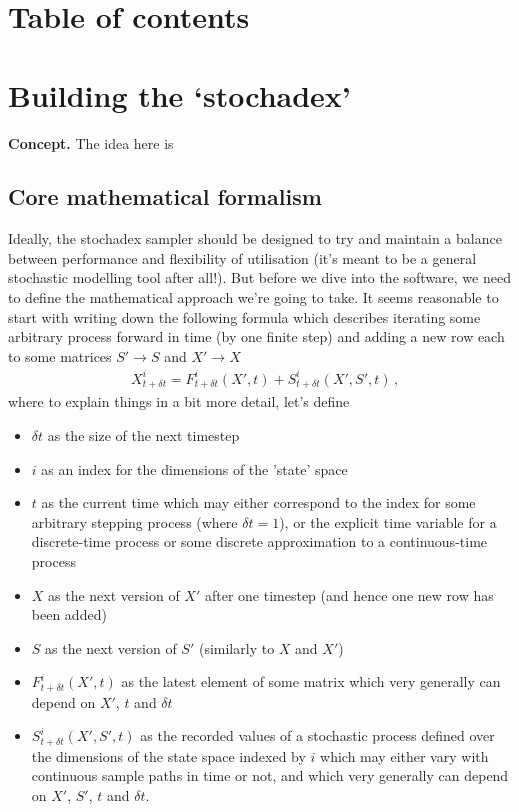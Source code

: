\documentclass{book}
\begin{document}
\chapter*{Table of contents}
\vspace*{-3cm}
{\sffamily \tableofcontents}
\mainmatter



\chapter{\sffamily Building the `stochadex'}

\vspace*{1cm}
{\bfseries\sffamily Concept.} The idea here is 

\vspace*{1cm}
\section{\sffamily Core mathematical formalism}

Ideally, the stochadex sampler should be designed to try and maintain a balance between performance and flexibility of utilisation (it's meant to be a general stochastic modelling tool after all!). But before we dive into the software, we need to define the mathematical approach we're going to take. It seems reasonable to start with writing down the following formula which describes iterating some arbitrary process forward in time (by one finite step) and adding a new row each to some matrices $S' \rightarrow S$ and $X' \rightarrow X$
\begin{align}
& X^i_{t+\delta t} = F^i_{t+\delta t}(X',t) + S^i_{t+\delta t}(X',S',t)\,,
\end{align}
where to explain things in a bit more detail, let's define

\begin{itemize}
\item[]{$\delta t$ as the size of the next timestep}
\item[]{$i$ as an index for the dimensions of the 'state' space}
\item[]{$t$ as the current time which may either correspond to the index for some arbitrary stepping process (where $\delta t = 1$), or the explicit time variable for a discrete-time process or some discrete approximation to a continuous-time process}
\item[]{$X$ as the next version of $X'$ after one timestep (and hence one new row has been added)}
\item[]{$S$ as the next version of $S'$ (similarly to $X$ and $X'$)}
\item[]{$F^i_{t+\delta t}(X', t)$ as the latest element of some matrix which very generally can depend on $X'$, $t$ and $\delta t$}
\item[]{$S^i_{t+\delta t}(X', S', t)$ as the recorded values of a stochastic process defined over the dimensions of the state space indexed by $i$ which may either vary with continuous sample paths in time or not, and which very generally can depend on $X'$, $S'$, $t$ and $\delta t$.}
\end{itemize}
\end{document}
